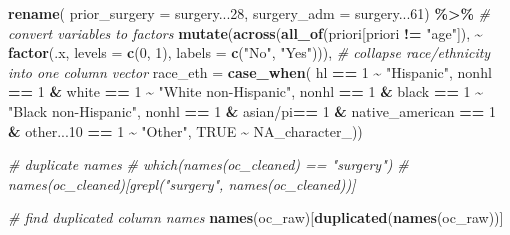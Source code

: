 \documentclass[
]{article}
\newenvironment{Shaded}{\begin{snugshade}}{\end{snugshade}}
\newcommand{\AttributeTok}[1]{\textcolor[rgb]{0.13,0.29,0.53}{#1}}
\newcommand{\CommentTok}[1]{\textcolor[rgb]{0.56,0.35,0.01}{\textit{#1}}}
\newcommand{\ConstantTok}[1]{\textcolor[rgb]{0.56,0.35,0.01}{#1}}
\newcommand{\DecValTok}[1]{\textcolor[rgb]{0.00,0.00,0.81}{#1}}
\newcommand{\FunctionTok}[1]{\textcolor[rgb]{0.13,0.29,0.53}{\textbf{#1}}}
\newcommand{\NormalTok}[1]{#1}
\newcommand{\SpecialCharTok}[1]{\textcolor[rgb]{0.81,0.36,0.00}{\textbf{#1}}}
\newcommand{\StringTok}[1]{\textcolor[rgb]{0.31,0.60,0.02}{#1}}
\begin{document}
\begin{Shaded}
\begin{Highlighting}[]
  \FunctionTok{rename}\NormalTok{(}
    \AttributeTok{prior\_surgery =}\NormalTok{ surgery...}\DecValTok{28}\NormalTok{,}
    \AttributeTok{surgery\_adm =}\NormalTok{ surgery...}\DecValTok{61}\NormalTok{) }\SpecialCharTok{\%\textgreater{}\%} 
  \CommentTok{\# convert variables to factors}
  \FunctionTok{mutate}\NormalTok{(}\FunctionTok{across}\NormalTok{(}\FunctionTok{all\_of}\NormalTok{(priori[priori }\SpecialCharTok{!=} \StringTok{"age"}\NormalTok{]),}
                \SpecialCharTok{\textasciitilde{}} \FunctionTok{factor}\NormalTok{(.x, }\AttributeTok{levels =} \FunctionTok{c}\NormalTok{(}\DecValTok{0}\NormalTok{, }\DecValTok{1}\NormalTok{), }\AttributeTok{labels =} \FunctionTok{c}\NormalTok{(}\StringTok{"No"}\NormalTok{, }\StringTok{"Yes"}\NormalTok{))),}
         \CommentTok{\# collapse race/ethnicity into one column vector}
         \AttributeTok{race\_eth =} \FunctionTok{case\_when}\NormalTok{(}
\NormalTok{           hl }\SpecialCharTok{==} \DecValTok{1} \SpecialCharTok{\textasciitilde{}} \StringTok{"Hispanic"}\NormalTok{,}
\NormalTok{           nonhl }\SpecialCharTok{==} \DecValTok{1} \SpecialCharTok{\&}\NormalTok{ white }\SpecialCharTok{==} \DecValTok{1} \SpecialCharTok{\textasciitilde{}} \StringTok{"White non{-}Hispanic"}\NormalTok{,}
\NormalTok{           nonhl }\SpecialCharTok{==} \DecValTok{1} \SpecialCharTok{\&}\NormalTok{ black }\SpecialCharTok{==} \DecValTok{1} \SpecialCharTok{\textasciitilde{}} \StringTok{"Black non{-}Hispanic"}\NormalTok{,}
\NormalTok{           nonhl }\SpecialCharTok{==} \DecValTok{1} \SpecialCharTok{\&} \StringTok{\textasciigrave{}}\AttributeTok{asian/pi}\StringTok{\textasciigrave{}}\SpecialCharTok{==} \DecValTok{1} \SpecialCharTok{\&}\NormalTok{ native\_american }\SpecialCharTok{==} \DecValTok{1} \SpecialCharTok{\&}\NormalTok{ other...}\DecValTok{10} \SpecialCharTok{==} \DecValTok{1}
           \SpecialCharTok{\textasciitilde{}} \StringTok{"Other"}\NormalTok{,}
           \ConstantTok{TRUE} \SpecialCharTok{\textasciitilde{}} \ConstantTok{NA\_character\_}\NormalTok{))}

\CommentTok{\# duplicate names}
\CommentTok{\# which(names(oc\_cleaned) == "surgery")}
\CommentTok{\# names(oc\_cleaned)[grepl("surgery", names(oc\_cleaned))]}
\end{Highlighting}
\end{Shaded}

\begin{Shaded}
\begin{Highlighting}[]
\CommentTok{\# find duplicated column names}
\FunctionTok{names}\NormalTok{(oc\_raw)[}\FunctionTok{duplicated}\NormalTok{(}\FunctionTok{names}\NormalTok{(oc\_raw))]}
\end{Highlighting}
\end{Shaded}
\end{document}
